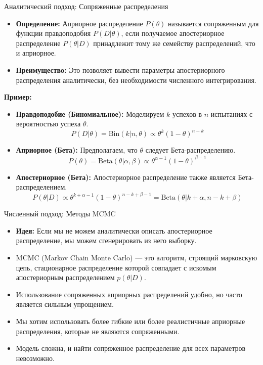 \documentclass[notheorems, handout]{beamer}
\begin{document}
\begin{frame}{Аналитический подход: Сопряженные распределения}
    \begin{itemize}
        \item \textbf{Определение:} Априорное распределение $P(\theta)$ называется сопряженным для функции правдоподобия $P(D|\theta)$, если получаемое апостериорное распределение $P(\theta|D)$ принадлежит тому же семейству распределений, что и априорное.
        \item \textbf{Преимущество:} Это позволяет вывести параметры апостериорного распределения аналитически, без необходимости численного интегрирования.
    \end{itemize}
    \vspace{0.5cm}
    \textbf{Пример:}
    \begin{itemize}
        \item \textbf{Правдоподобие (Биномиальное):} Моделируем $k$ успехов в $n$ испытаниях с вероятностью успеха $\theta$.
        \begin{equation*}
            P(D|\theta) = \text{Bin}(k|n, \theta) \propto \theta^k (1-\theta)^{n-k}
        \end{equation*}
        \item \textbf{Априорное (Бета):} Предполагаем, что $\theta$ следует Бета-распределению.
        \begin{equation*}
            P(\theta) = \text{Beta}(\theta|\alpha, \beta) \propto \theta^{\alpha-1} (1-\theta)^{\beta-1}
        \end{equation*}
        \item \textbf{Апостериорное (Бета):} Апостериорное распределение также является Бета-распределением.
        \begin{equation*}
            P(\theta|D) \propto \theta^{k+\alpha-1} (1-\theta)^{n-k+\beta-1} = \text{Beta}(\theta|k+\alpha, n-k+\beta)
        \end{equation*}
    \end{itemize}
\end{frame}

\begin{frame}{Численный подход: Методы MCMC}
    \begin{itemize}
        \item \textbf{Идея:} Если мы не можем аналитически описать апостериорное распределение, мы можем сгенерировать из него выборку.
        \item MCMC (Markov Chain Monte Carlo) --- это алгоритм, строящий марковскую цепь, стационарное распределение которой совпадает с искомым апостериорным распределением $p(\theta|D)$.
         \item Использование сопряженных априорных распределений удобно, но часто является сильным упрощением.
        \item Мы хотим использовать более гибкие или более реалистичные априорные распределения, которые не являются сопряженными.
        \item Модель сложна, и найти сопряженное распределение для всех параметров невозможно.
    \end{itemize}
    \vspace{0.5cm}
\end{frame}
\end{document}
